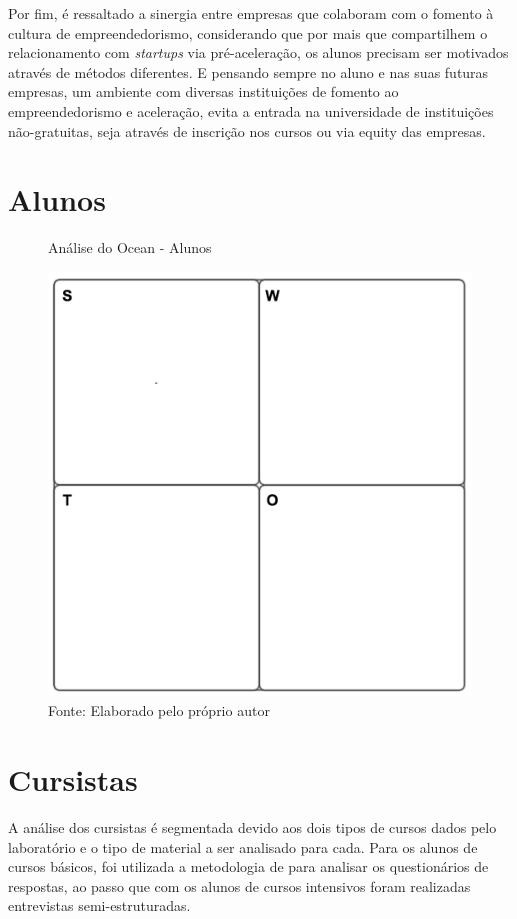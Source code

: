 Por fim, é ressaltado a sinergia entre empresas que colaboram com o fomento à cultura de empreendedorismo, considerando que por mais que compartilhem o relacionamento com \textit{startups} via pré-aceleração, os alunos precisam ser motivados através de métodos diferentes. E pensando sempre no aluno e nas suas futuras empresas, um ambiente com diversas instituições de fomento ao empreendedorismo e aceleração, evita a entrada na universidade de instituições não-gratuitas, seja através de inscrição nos cursos ou via equity das empresas.

\section{Alunos}

\begin{figure}[H]
\caption{Análise do Ocean - Alunos}
\centerline{\includegraphics[scale=0.75]{img/generalswot}}
\label{fig:swotalunos}
\caption* {Fonte: Elaborado pelo próprio autor}
\end{figure}

\section{Cursistas}

A análise dos cursistas é segmentada devido aos dois tipos de cursos dados pelo laboratório e o tipo de material a ser analisado para cada. Para os alunos de cursos básicos, foi utilizada a metodologia de  para analisar os questionários de respostas, ao passo que com os alunos de cursos intensivos foram realizadas entrevistas semi-estruturadas.

